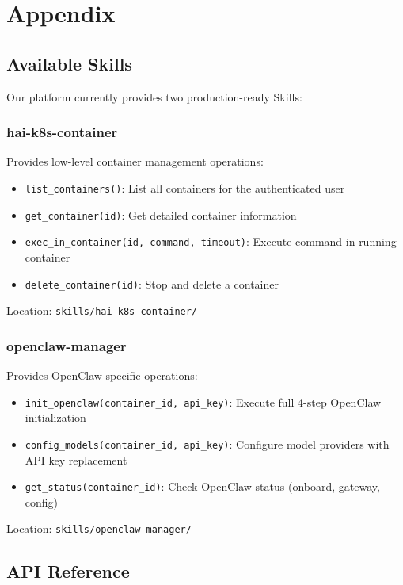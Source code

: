 \section*{Appendix}

\subsection{Available Skills}

Our platform currently provides two production-ready Skills:

\subsubsection{hai-k8s-container}

Provides low-level container management operations:

\begin{itemize}
    \item \texttt{list\_containers()}: List all containers for the authenticated user
    \item \texttt{get\_container(id)}: Get detailed container information
    \item \texttt{exec\_in\_container(id, command, timeout)}: Execute command in running container
    \item \texttt{delete\_container(id)}: Stop and delete a container
\end{itemize}

Location: \texttt{skills/hai-k8s-container/}

\subsubsection{openclaw-manager}

Provides OpenClaw-specific operations:

\begin{itemize}
    \item \texttt{init\_openclaw(container\_id, api\_key)}: Execute full 4-step OpenClaw initialization
    \item \texttt{config\_models(container\_id, api\_key)}: Configure model providers with API key replacement
    \item \texttt{get\_status(container\_id)}: Check OpenClaw status (onboard, gateway, config)
\end{itemize}

Location: \texttt{skills/openclaw-manager/}

\subsection{API Reference}

